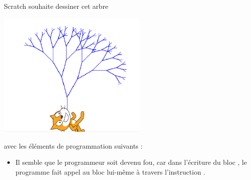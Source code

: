 \documentclass[class=report,crop=false, 12pt]{standalone}
\begin{document}
\begin{enigme}

Scratch souhaite dessiner cet arbre 
\begin{center}
  \includegraphics[width=0.55\textwidth]{ecran-11-eg3} 
\end{center}
avec les éléments de programmation suivants : %

\begin{center}
\begin{scratch}


\end{scratch}\qquad\qquad
\begin{scratch}
  {
  }
\end{scratch}
\end{center}

\begin{itemize}
  \item Il semble que le programmeur soit devenu fou, car dans l'écriture du bloc , le programme fait appel
au bloc  lui-même à travers l'instruction .


\end{itemize}
\end{enigme}
\end{document}
